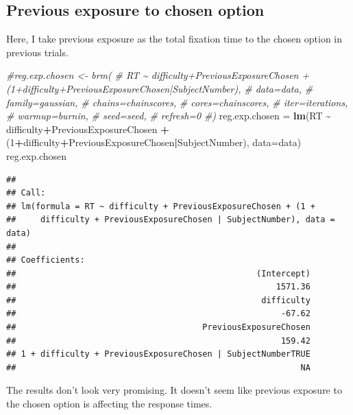 \documentclass[
]{book}
\newenvironment{Shaded}{\begin{snugshade}}{\end{snugshade}}
\newcommand{\AttributeTok}[1]{\textcolor[rgb]{0.13,0.29,0.53}{#1}}
\newcommand{\CommentTok}[1]{\textcolor[rgb]{0.56,0.35,0.01}{\textit{#1}}}
\newcommand{\DecValTok}[1]{\textcolor[rgb]{0.00,0.00,0.81}{#1}}
\newcommand{\FunctionTok}[1]{\textcolor[rgb]{0.13,0.29,0.53}{\textbf{#1}}}
\newcommand{\NormalTok}[1]{#1}
\newcommand{\OtherTok}[1]{\textcolor[rgb]{0.56,0.35,0.01}{#1}}
\newcommand{\SpecialCharTok}[1]{\textcolor[rgb]{0.81,0.36,0.00}{\textbf{#1}}}
\begin{document}
\hypertarget{previous-exposure-to-chosen-option}{%
\subsection{Previous exposure to chosen option}\label{previous-exposure-to-chosen-option}}

Here, I take previous exposure as the total fixation time to the chosen option in previous trials.

\begin{Shaded}
\begin{Highlighting}[]
\CommentTok{\#reg.exp.chosen \textless{}{-} brm(}
\CommentTok{\#  RT \textasciitilde{} difficulty+PreviousExposureChosen + (1+difficulty+PreviousExposureChosen|SubjectNumber),}
\CommentTok{\#  data=data,}
\CommentTok{\#  family=gaussian,}
\CommentTok{\#  chains=chainscores,}
\CommentTok{\#  cores=chainscores,}
\CommentTok{\#  iter=iterations,}
\CommentTok{\#  warmup=burnin,}
\CommentTok{\#  seed=seed,}
\CommentTok{\#  refresh=0}
\CommentTok{\#)}
\NormalTok{reg.exp.chosen }\OtherTok{=} \FunctionTok{lm}\NormalTok{(RT }\SpecialCharTok{\textasciitilde{}}\NormalTok{ difficulty}\SpecialCharTok{+}\NormalTok{PreviousExposureChosen }\SpecialCharTok{+}\NormalTok{ (}\DecValTok{1}\SpecialCharTok{+}\NormalTok{difficulty}\SpecialCharTok{+}\NormalTok{PreviousExposureChosen}\SpecialCharTok{|}\NormalTok{SubjectNumber), }\AttributeTok{data=}\NormalTok{data)}
\NormalTok{reg.exp.chosen}
\end{Highlighting}
\end{Shaded}

\begin{verbatim}
## 
## Call:
## lm(formula = RT ~ difficulty + PreviousExposureChosen + (1 + 
##     difficulty + PreviousExposureChosen | SubjectNumber), data = data)
## 
## Coefficients:
##                                                 (Intercept)  
##                                                     1571.36  
##                                                  difficulty  
##                                                      -67.62  
##                                      PreviousExposureChosen  
##                                                      159.42  
## 1 + difficulty + PreviousExposureChosen | SubjectNumberTRUE  
##                                                          NA
\end{verbatim}

The results don't look very promising. It doesn't seem like previous exposure to the chosen option is affecting the response times.
\end{document}
